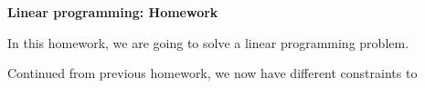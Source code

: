 \documentclass[12pt]{article}
\begin{document}
    \begin{center}
        \textbf{Linear programming: Homework}
    \end{center}

    In this homework, we are going to solve a linear programming problem.

    Continued from previous homework, we now have different constraints to 
\end{document}
